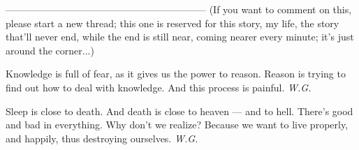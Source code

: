 --------------------------------------------------------------
(If you want to comment on this, please start a new thread; this one is reserved for this story, my life, the story that'll never end, while the end is still near, coming nearer every minute; it's just around the corner...)

Knowledge 
is full of fear, 
as it gives us the power 
to reason. 
Reason 
is trying to find out 
how to deal with knowledge. 
And this process 
is painful. 
\emph{W.G.}

Sleep 
is close to death. 
And death 
is close to heaven --- 
and to hell. 
There's good and bad 
in everything. 
Why don't we realize? 
Because we want to live 
properly, and happily, 
thus destroying ourselves. 
\emph{W.G.}
